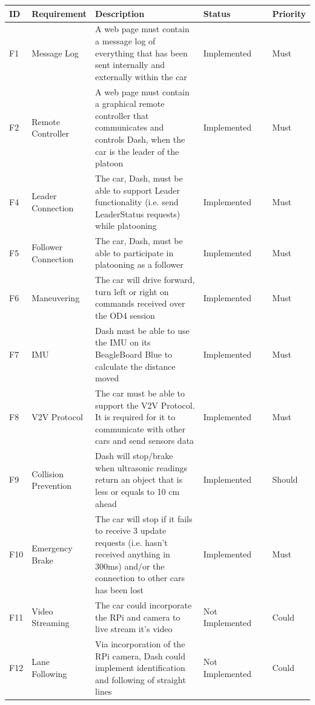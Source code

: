 \documentclass[12pt]{article}
\begin{document}
\begin{longtable}{| p{0.05\linewidth} | p{0.15\linewidth} | p{0.45\linewidth} | p{0.25\linewidth} | p{0.1\linewidth} |}\hline 
    ID & Requirement & Description & Status & Priority \\ \hline
   	F1 & Message Log & A web page must contain a message log of everything that has been sent internally and externally within the car & Implemented & Must\\ \hline
   	F2 & Remote Controller & A web page must contain a graphical remote controller that communicates and controls Dash, when the car is the leader of the platoon & Implemented & Must\\ \hline
   	F4 & Leader Connection & The car, Dash, must be able to support Leader functionality (i.e. send LeaderStatus requests) while platooning & Implemented & Must\\ \hline       
    F5 & Follower Connection & The car, Dash, must be able to participate in platooning as a follower & Implemented & Must\\ \hline
    F6 & Maneuvering & The car will drive forward, turn left or right on commands received over the OD4 session & Implemented & Must\\ \hline
   	F7 & IMU & Dash must be able to use the IMU on its BeagleBoard Blue to calculate the distance moved & Implemented & Must\\ \hline
   	F8 & V2V Protocol & The car must be able to support the V2V Protocol. It is required for it to communicate with other cars and send sensors data & Implemented & Must\\ \hline
   	F9 & Collision Prevention & Dash will stop/brake when ultrasonic readings return an object that is less or equals to 10 cm ahead &  Implemented & Should\\ \hline
   	F10 & Emergency Brake & The car will stop if it fails to receive 3 update requests (i.e. hasn’t received anything in 300ms) and/or the connection to other cars has been lost & Implemented & Must\\ \hline
    F11 & Video Streaming& The car could incorporate the RPi and camera to live stream it’s video & Not Implemented & Could\\ \hline
  	F12 & Lane Following & Via incorporation of the RPi camera, Dash could implement identification and following of straight lines & Not Implemented & Could\\ \hline
\end{longtable}
\pagebreak
\end{document}

